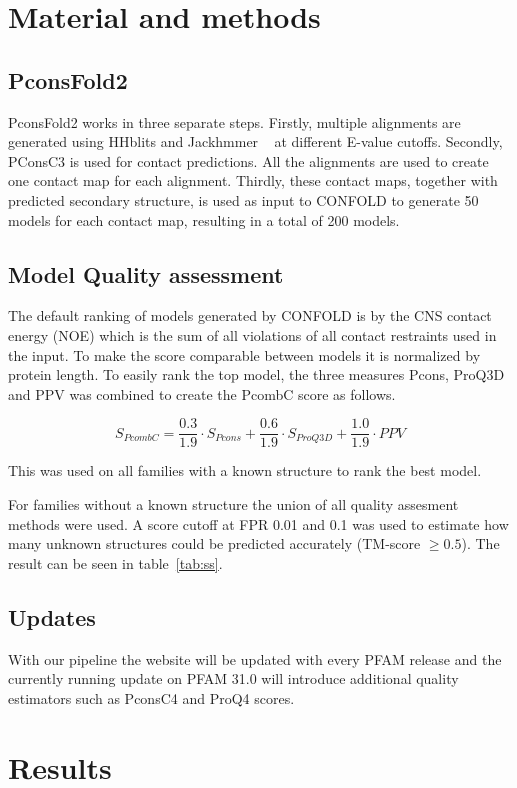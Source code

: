 \documentclass[a4,center,fleqn]{NAR}
\begin{document}
\section{Material and methods}
\subsection{PconsFold2}
PconsFold2 works in three separate steps. Firstly, multiple alignments
are generated using HHblits and Jackhmmer ~\cite{eddy22039361} at different 
E-value cutoffs.
Secondly, PConsC3 is used for contact predictions. All the alignments are used to 
create one contact map for each alignment.
Thirdly, these contact maps, together with predicted secondary structure, is used
as input to CONFOLD to generate 50 models for each contact map, resulting in a total
of 200 models.

\subsection{Model Quality assessment}
The default ranking of models generated by CONFOLD is by the CNS contact energy (NOE) 
which is the sum of all violations of all contact restraints used in the input.
To make the score comparable between models it is normalized by protein length.
To easily rank the top model, the three measures Pcons, ProQ3D and PPV was 
combined to create the PcombC score as follows.

$$
S_{PcombC} = \frac{0.3}{1.9} \cdot S_{Pcons} + \frac{0.6}{1.9} \cdot S_{ProQ3D} + \frac{1.0}{1.9} \cdot PPV
$$

This was used on all families with a known structure to rank the best model.

For families without a known structure the union of all quality assesment methods were used.
A score cutoff at FPR 0.01 and 0.1 was used to estimate how many unknown structures
could be predicted accurately (TM-score $\ge 0.5$). The result can be seen in table~\ref{tab:ss}.
\subsection{Updates}

With our pipeline the website will be updated with every PFAM release
and the currently running update on PFAM 31.0 will introduce
additional quality estimators such as PconsC4 and ProQ4
scores. 

\section{Results}
\end{document}
